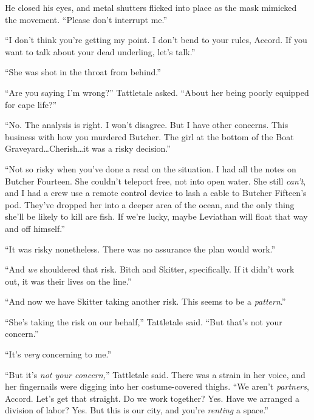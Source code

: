 He closed his eyes, and metal shutters flicked into place as the mask mimicked the movement.  ``Please don't interrupt me.''



``I don't think you're getting my point.  I don't bend to your rules, Accord.  If you want to talk about your dead underling, let's talk.''



``She was shot in the throat from behind.''



``Are you saying I'm wrong?'' Tattletale asked.  ``About her being poorly equipped for cape life?''



``No.  The analysis is right.  I won't disagree.  But I have other concerns.  This business with how you murdered Butcher.  The girl at the bottom of the Boat Graveyard\ldots Cherish\ldots it was a risky decision.''



``Not so risky when you've done a read on the situation.  I had all the notes on Butcher Fourteen.  She couldn't teleport free, not into open water.  She still \emph{can't}, and I had a crew use a remote control device to lash a cable to Butcher Fifteen's pod.  They've dropped her into a deeper area of the ocean, and the only thing she'll be likely to kill are fish.  If we're lucky, maybe Leviathan will float that way and off himself.''



``It was risky nonetheless.  There was no assurance the plan would work.''



``And \emph{we} shouldered that risk.  Bitch and Skitter, specifically.  If it didn't work out, it was their lives on the line.''



``And now we have Skitter taking another risk.  This seems to be a \emph{pattern}.''



``She's taking the risk on our behalf,'' Tattletale said.  ``But that's not your concern.''



``It's \emph{very} concerning to me.''



``But it's \emph{not your concern,}'' Tattletale said.  There was a strain in her voice, and her fingernails were digging into her costume-covered thighs.  ``We aren't \emph{partners}, Accord.  Let's get that straight.  Do we work together?  Yes.  Have we arranged a division of labor?  Yes.  But this is our city, and you're \emph{renting} a space.''



